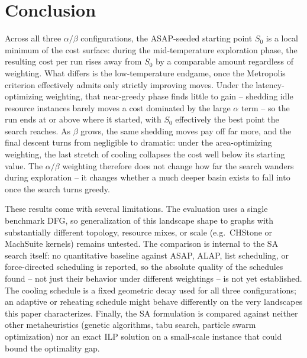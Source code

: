 \documentclass[conference]{IEEEtran}
\begin{document}
    \section{Conclusion}
    \label{sec:conclusion}

    Across all three $\alpha/\beta$ configurations, the ASAP-seeded starting point $S_0$ is a local
    minimum of the cost surface: during the mid-temperature exploration phase, the resulting cost
    per run rises away from $S_0$ by a comparable amount regardless of weighting. What differs is
    the low-temperature endgame, once the Metropolis criterion effectively admits only strictly
    improving moves. Under the latency-optimizing weighting, that near-greedy phase finds little to
    gain -- shedding idle resource instances barely moves a cost dominated by the large $\alpha$
    term -- so the run ends at or above where it started, with $S_0$ effectively the best point the
    search reaches. As $\beta$ grows, the same shedding moves pay off far more, and the final
    descent turns from negligible to dramatic: under the area-optimizing weighting, the last stretch
    of cooling collapses the cost well below its starting value. The $\alpha/\beta$ weighting
    therefore does not change how far the search wanders during exploration -- it changes whether a
    much deeper basin exists to fall into once the search turns greedy.

    These results come with several limitations. The evaluation uses a single benchmark DFG, so
    generalization of this landscape shape to graphs with substantially different topology,
    resource mixes, or scale (e.g.\ CHStone or MachSuite kernels) remains untested. The
    comparison is internal to the SA search itself: no quantitative baseline against ASAP, ALAP,
    list scheduling, or force-directed scheduling is reported, so the absolute quality of the
    schedules found -- not just their behavior under different weightings -- is not yet
    established. The cooling schedule is a fixed geometric decay used for all three
    configurations; an adaptive or reheating schedule might behave differently on the very
    landscapes this paper characterizes. Finally, the SA formulation is compared against neither
    other metaheuristics (genetic algorithms, tabu search, particle swarm optimization) nor an
    exact ILP solution on a small-scale instance that could bound the optimality gap.


    
\end{document}
